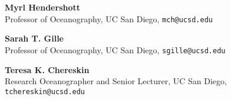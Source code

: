 \documentclass[a4paper,11pt,final]{memoir}
\newcommand{\Sep}{\vspace{1.5em}}
\newcommand{\SmallSep}{\vspace{0.5em}}
\newcommand{\CVSection}[1]
    {\Large\textbf{#1}\par
    \SmallSep\normalsize\normalfont}
\newcommand{\CVItem}[1]
    {\textbf{\color{NavyBlue} #1}}
\begin{document}
\SmallSep

\CVItem{Myrl Hendershott}\\
Professor of Oceanography, UC San Diego, \texttt{mch@ucsd.edu}


\SmallSep

\CVItem{Sarah T. Gille}\\
Professor of Oceanography, UC San Diego, \texttt{sgille@ucsd.edu}



\SmallSep

\CVItem{Teresa K. Chereskin}\\
Research Oceanographer and Senior Lecturer, UC San Diego, \texttt{tchereskin@ucsd.edu}








%
%
%
%
%
\end{document}

